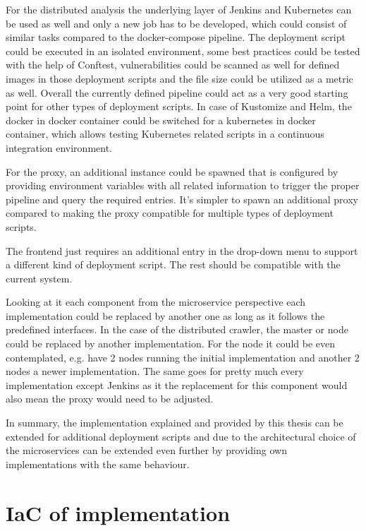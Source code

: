 For the distributed analysis the underlying layer of Jenkins and Kubernetes can be used as well and only a new job has to be developed, which could consist of similar tasks compared to the docker-compose pipeline. The deployment script could be executed in an isolated environment, some best practices could be tested with the help of Conftest, vulnerabilities could be scanned as well for defined images in those deployment scripts and the file size could be utilized as a metric as well. Overall the currently defined pipeline could act as a very good starting point for other types of deployment scripts. In case of Kustomize and Helm, the docker in docker container could be switched for a kubernetes in docker container, which allows testing Kubernetes related scripts in a continuous integration environment.

For the proxy, an additional instance could be spawned that is configured by providing environment variables with all related information to trigger the proper pipeline and query the required entries. It's simpler to spawn an additional proxy compared to making the proxy compatible for multiple types of deployment scripts.

The frontend just requires an additional entry in the drop-down menu to support a different kind of deployment script. The rest should be compatible with the current system.

Looking at it each component from the microservice perspective each implementation could be replaced by another one as long as it follows the predefined interfaces. In the case of the distributed crawler, the master or node could be replaced by another implementation. For the node it could be even contemplated, e.g. have 2 nodes running the initial implementation and another 2 nodes a newer implementation. The same goes for pretty much every implementation except Jenkins as it the replacement for this component would also mean the proxy would need to be adjusted.

In summary, the implementation explained and provided by this thesis can be extended for additional deployment scripts and due to the architectural choice of the microservices can be extended even further by providing own implementations with the same behaviour.

\section{IaC of implementation}

